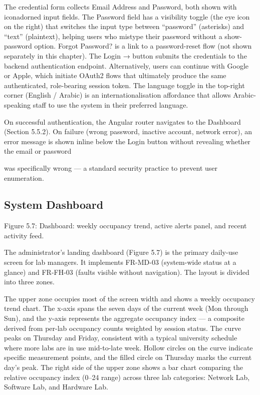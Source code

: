 The credential form collects Email Address and Password, both shown with iconadorned input ﬁelds. The Password ﬁeld has a visibility toggle (the eye icon on the right)
that switches the input type between ``password'' (asterisks) and ``text'' (plaintext), helping
users who mistype their password without a show-password option. Forgot Password? is a
link to a password-reset ﬂow (not shown separately in this chapter). The Login → button
submits the credentials to the backend authentication endpoint. Alternatively, users can
continue with Google or Apple, which initiate OAuth2 ﬂows that ultimately produce the
same authenticated, role-bearing session token. The language toggle in the top-right corner
(English / Arabic) is an internationalisation affordance that allows Arabic-speaking staff to
use the system in their preferred language.

On successful authentication, the Angular router navigates to the Dashboard (Section 5.5.2). On failure (wrong password, inactive account, network error), an error message
is shown inline below the Login button without revealing whether the email or password



was speciﬁcally wrong --- a standard security practice to prevent user enumeration.



\subsection{System Dashboard}





Figure 5.7: Dashboard: weekly occupancy trend, active alerts panel, and recent activity feed.


The administrator's landing dashboard (Figure 5.7) is the primary daily-use screen for
lab managers. It implements FR-MD-03 (system-wide status at a glance) and FR-FH-03
(faults visible without navigation). The layout is divided into three zones.

The upper zone occupies most of the screen width and shows a weekly occupancy
trend chart. The x-axis spans the seven days of the current week (Mon through Sun), and
the y-axis represents the aggregate occupancy index --- a composite derived from per-lab
occupancy counts weighted by session status. The curve peaks on Thursday and Friday,
consistent with a typical university schedule where more labs are in use mid-to-late week.
Hollow circles on the curve indicate speciﬁc measurement points, and the ﬁlled circle on
Thursday marks the current day's peak. The right side of the upper zone shows a bar chart
comparing the relative occupancy index (0--24 range) across three lab categories: Network
Lab, Software Lab, and Hardware Lab.

